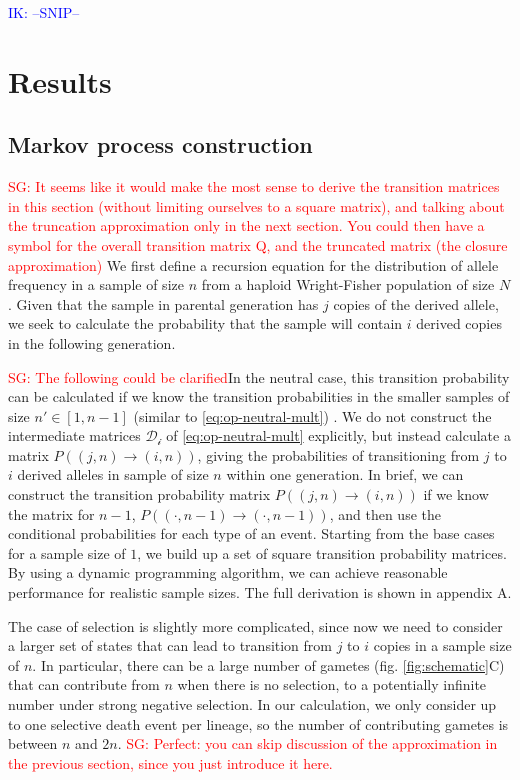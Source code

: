 \documentclass[review]{elsarticle}
\newcommand{\ra}{\rightarrow}
\newcommand{\sgcomment}[1]{\textcolor{red}{SG: #1}}
\newcommand{\ikcomment}[1]{\textcolor{blue}{IK: #1}}
\begin{document}
\ikcomment{--SNIP--}

\section{Results}
\label{sec:results}

\subsection{Markov process construction}
\label{subsec:markov}
\sgcomment{It seems like it would make the most sense to derive the transition matrices in this section (without limiting ourselves to a square matrix), and talking about the truncation approximation only in the next section. You could then have a symbol for the overall transition matrix Q, and the truncated matrix (the closure approximation)}
We first define a recursion equation for the distribution of allele frequency in a sample of size
$n$ from a haploid Wright-Fisher population of size $N$. Given that the sample in parental generation
has $j$ copies of the derived allele, we seek to calculate the probability that the sample
will contain $i$ derived copies in the following generation.

\sgcomment{The following could be clarified}In the neutral case, this transition probability can be calculated if we know the transition
probabilities in the smaller samples of size $n' \in [1, n-1]$ (similar to
\eqref{eq:op-neutral-mult}) \citep{BhaskarEtAl2014}. We do not construct the intermediate matrices
$\mathcal{D_i}$ of \eqref{eq:op-neutral-mult} explicitly, but instead calculate a matrix
$P((j,n)\ra(i,n))$, giving the probabilities of transitioning from $j$ to $i$ derived alleles in
sample of size $n$ within one generation. In brief, we can construct the transition probability
matrix $P((j,n)\ra(i,n))$ if we know the matrix for $n-1$, $P((\cdot,n-1)\ra(\cdot,n-1))$, and then
use the conditional probabilities for each type of an event. Starting from the base cases for a
sample size of $1$, we build up a set of square transition probability matrices. By using a dynamic
programming algorithm, we can achieve reasonable performance for realistic sample sizes. The full
derivation is shown in appendix A.

The case of selection is slightly more complicated, since now we need to consider a larger set of
states that can lead to transition from $j$ to $i$ copies in a sample size of $n$. In particular,
there can be a large number of gametes (fig. \ref{fig:schematic}C) that can contribute from $n$ when
there is no selection, to a potentially infinite number under strong negative selection. In our
calculation, we only consider up to one selective death event per lineage, so the number of
contributing gametes is between $n$ and $2n$. \sgcomment{Perfect: you can skip discussion of the approximation in the previous section, since you just introduce it here. }
\end{document}
